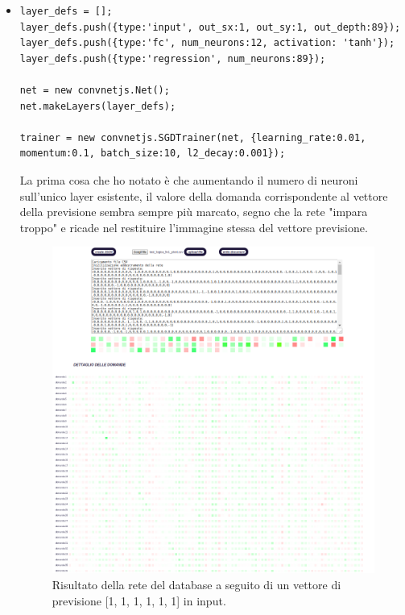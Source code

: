 \begin{itemize}
\item \begin{verbatim}
layer_defs = [];
layer_defs.push({type:'input', out_sx:1, out_sy:1, out_depth:89});
layer_defs.push({type:'fc', num_neurons:12, activation: 'tanh'});
layer_defs.push({type:'regression', num_neurons:89});

net = new convnetjs.Net();
net.makeLayers(layer_defs);

trainer = new convnetjs.SGDTrainer(net, {learning_rate:0.01, momentum:0.1, batch_size:10, l2_decay:0.001});
\end{verbatim}
La prima cosa che ho notato \`e che aumentando il numero di neuroni sull'unico layer esistente, il valore della domanda corrispondente al vettore della previsione sembra sempre pi\`u marcato, segno che la rete "impara troppo" e ricade nel restituire l'immagine stessa del vettore previsione.

\begin{figure}[H]
\centering
	\includegraphics[width=0.90\linewidth]{./image/rete_db-vp1architettura2.png}
	\caption{Risultato della rete del database a seguito di un vettore di previsione [1, 1, 1, 1, 1, 1] in input.}
\end{figure}


\end{itemize}
